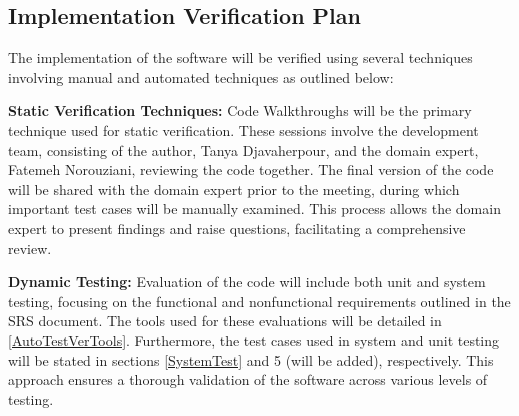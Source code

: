 \documentclass[12pt, titlepage]{article}
\begin{document}



\subsection{Implementation Verification Plan}\label{ImplementationVerPlan}

The implementation of the software will be verified using several techniques
involving manual and automated techniques as outlined below:

\begin{inparaitem}
  \item \textbf{Static Verification Techniques:}
  Code Walkthroughs will be the primary technique used for static verification. 
  These sessions involve the development team, consisting of the author, Tanya Djavaherpour, 
  and the domain expert, Fatemeh Norouziani, reviewing the code together. 
  The final version of the code will be shared with the domain expert prior 
  to the meeting, during which important test cases will be manually examined. 
  This process allows the domain expert to present findings and raise questions, 
  facilitating a comprehensive review.

  \item \textbf{Dynamic Testing:}
  Evaluation of the code will include both unit and system testing, focusing on 
  the functional and nonfunctional requirements outlined in the
  SRS \cite{SRS} document.
  The tools used for these evaluations will be detailed in \ref{AutoTestVerTools}. Furthermore, the test cases 
  used in system and unit testing will be stated in sections \ref{SystemTest} and 5 (will be added),
  respectively.
  This approach ensures a thorough validation of the software across various levels of testing.

\end{inparaitem}


\end{document}
